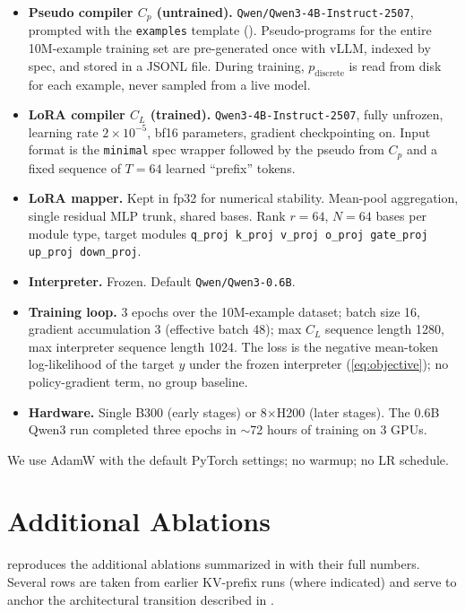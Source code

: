 \begin{itemize}
\item \textbf{Pseudo compiler $C_p$ (untrained).} \texttt{Qwen/Qwen3-4B-Instruct-2507}, prompted with the \texttt{examples} template (). Pseudo-programs for the entire 10M-example training set are pre-generated once with vLLM, indexed by spec, and stored in a JSONL file. During training, $p_{\text{discrete}}$ is read from disk for each example, never sampled from a live model.
\item \textbf{LoRA compiler $C_L$ (trained).} \texttt{Qwen3-4B-Instruct-2507}, fully unfrozen, learning rate $2 \times 10^{-5}$, bf16 parameters, gradient checkpointing on. Input format is the \texttt{minimal} spec wrapper followed by the pseudo from $C_p$ and a fixed sequence of $T = 64$ learned ``prefix'' tokens.
\item \textbf{LoRA mapper.} Kept in fp32 for numerical stability. Mean-pool aggregation, single residual MLP trunk, shared bases. Rank $r = 64$, $N = 64$ bases per module type, target modules \texttt{q\_proj k\_proj v\_proj o\_proj gate\_proj up\_proj down\_proj}.
\item \textbf{Interpreter.} Frozen. Default \texttt{Qwen/Qwen3-0.6B}.
\item \textbf{Training loop.} 3 epochs over the 10M-example dataset; batch size 16, gradient accumulation 3 (effective batch 48); max $C_L$ sequence length 1280, max interpreter sequence length 1024. The loss is the negative mean-token log-likelihood of the target $y$ under the frozen interpreter (\cref{eq:objective}); no policy-gradient term, no group baseline.
\item \textbf{Hardware.} Single B300 (early stages) or 8$\times$H200 (later stages). The 0.6B Qwen3 run completed three epochs in $\sim$72 hours of training on 3 GPUs.
\end{itemize}

We use AdamW with the default PyTorch settings; no warmup; no LR schedule.


\section{Additional Ablations}
\label{appendix:ablations}

 reproduces the additional ablations summarized in  with their full numbers. Several rows are taken from earlier KV-prefix runs (where indicated) and serve to anchor the architectural transition described in .

